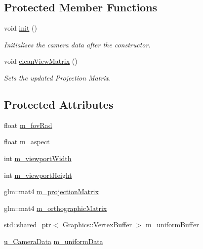 \subsection*{Protected Member Functions}
\begin{DoxyCompactItemize}
\item 
void \hyperlink{class_cookie_eng_1_1_object_1_1_camera_a25657d7f0704523a1fd10dd7e00d9d61}{init} ()
\begin{DoxyCompactList}\small\item\em Initialises the camera data after the constructor. \end{DoxyCompactList}\item 
void \hyperlink{class_cookie_eng_1_1_object_1_1_camera_ab18117758ca6a8d4fab5b9370bc14b96}{clean\+View\+Matrix} ()
\begin{DoxyCompactList}\small\item\em Sets the updated Projection Matrix. \end{DoxyCompactList}\end{DoxyCompactItemize}
\subsection*{Protected Attributes}
\begin{DoxyCompactItemize}
\item 
float \hyperlink{class_cookie_eng_1_1_object_1_1_camera_ad9e63b2dc45a36cef1075909c5521d71}{m\+\_\+fov\+Rad}
\item 
float \hyperlink{class_cookie_eng_1_1_object_1_1_camera_a86c6f04a4f39bfa931493b1f6b9c013c}{m\+\_\+aspect}
\item 
int \hyperlink{class_cookie_eng_1_1_object_1_1_camera_a257e21bd91592e599162cd6bf0d618d6}{m\+\_\+viewport\+Width}
\item 
int \hyperlink{class_cookie_eng_1_1_object_1_1_camera_a5a65724cf71fe2ce24e4ee2071a4e068}{m\+\_\+viewport\+Height}
\item 
glm\+::mat4 \hyperlink{class_cookie_eng_1_1_object_1_1_camera_a6a5152fd8fbd92c4cbcc73d14511e584}{m\+\_\+projection\+Matrix}
\item 
glm\+::mat4 \hyperlink{class_cookie_eng_1_1_object_1_1_camera_a555458f718b0b09ba0e8a88fef64bce3}{m\+\_\+orthographic\+Matrix}
\item 
std\+::shared\+\_\+ptr$<$ \hyperlink{class_cookie_eng_1_1_graphics_1_1_vertex_buffer}{Graphics\+::\+Vertex\+Buffer} $>$ \hyperlink{class_cookie_eng_1_1_object_1_1_camera_ae7715274f84e9b2e164c32a528989c3b}{m\+\_\+uniform\+Buffer}
\item 
\hyperlink{struct_cookie_eng_1_1_object_1_1u___camera_data}{u\+\_\+\+Camera\+Data} \hyperlink{class_cookie_eng_1_1_object_1_1_camera_acd3f4dab5ebb7b14b6e5ffd9704bccb6}{m\+\_\+uniform\+Data}
\end{DoxyCompactItemize}


